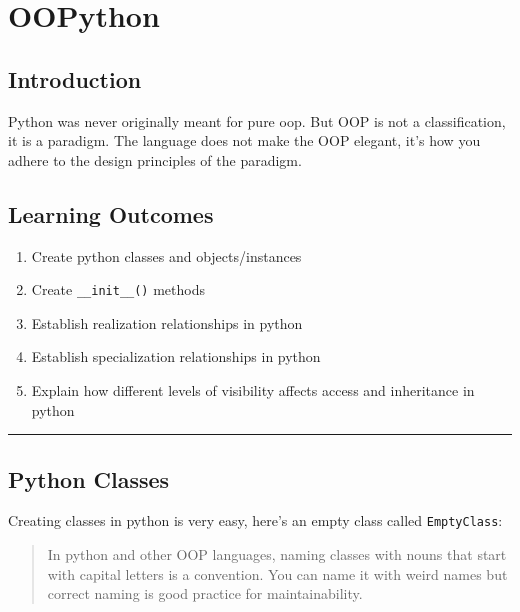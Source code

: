 \chapter{OOPython}\label{oopython.md__oopython}

\section{Introduction}\label{oopython.md__introduction}

Python was never originally meant for pure oop. But OOP is not a
classification, it is a paradigm. The language does not make the OOP
elegant, it's how you adhere to the design principles of the paradigm.

\section{Learning Outcomes}\label{oopython.md__learning-outcomes}

\begin{enumerate}
\def\labelenumi{\arabic{enumi}.}
\tightlist
\item
  Create python classes and objects/instances
\item
  Create \texttt{\_\_init\_\_()} methods
\item
  Establish realization relationships in python
\item
  Establish specialization relationships in python
\item
  Explain how different levels of visibility affects access and
  inheritance in python
\end{enumerate}

\begin{center}\rule{0.5\linewidth}{0.5pt}\end{center}

\section{Python Classes}\label{oopython.md__python-classes}

Creating classes in python is very easy, here's an empty class called
\texttt{EmptyClass}:

\begin{quote}
In python and other OOP languages, naming classes with nouns that start
with capital letters is a convention. You can name it with weird names
but correct naming is good practice for maintainability.
\end{quote}

